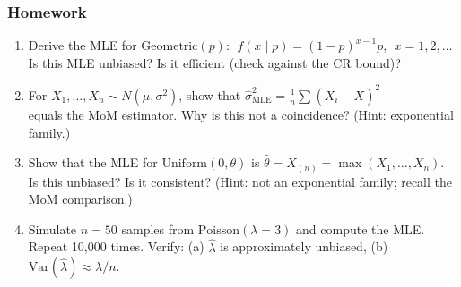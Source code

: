 \documentclass[aspectratio=169]{beamer}
\begin{document}
\begin{frame}
\frametitle{Homework}
\begin{enumerate}
  \item Derive the MLE for $\text{Geometric}(p)$: $\;f(x \mid p) = (1-p)^{x-1}p$, $\;x = 1, 2, \ldots$\\
    Is this MLE unbiased? Is it efficient (check against the CR bound)?

  \vspace{0.15cm}
  \item For $X_1, \ldots, X_n \sim N(\mu, \sigma^2)$, show that $\hat\sigma^2_{\text{MLE}} = \frac{1}{n}\sum(X_i - \bar{X})^2$\\
    equals the MoM estimator. Why is this not a coincidence? (Hint: exponential family.)

  \vspace{0.15cm}
  \item Show that the MLE for $\text{Uniform}(0, \theta)$ is $\hat\theta = X_{(n)} = \max(X_1, \ldots, X_n)$.\\
    Is this unbiased? Is it consistent? (Hint: not an exponential family; recall the MoM comparison.)

  \vspace{0.15cm}
  \item Simulate $n = 50$ samples from $\text{Poisson}(\lambda = 3)$ and compute the MLE.\\
    Repeat 10{,}000 times. Verify: (a) $\hat\lambda$ is approximately unbiased, (b)~$\text{Var}(\hat\lambda) \approx \lambda/n$.
\end{enumerate}
\end{frame}
\end{document}
